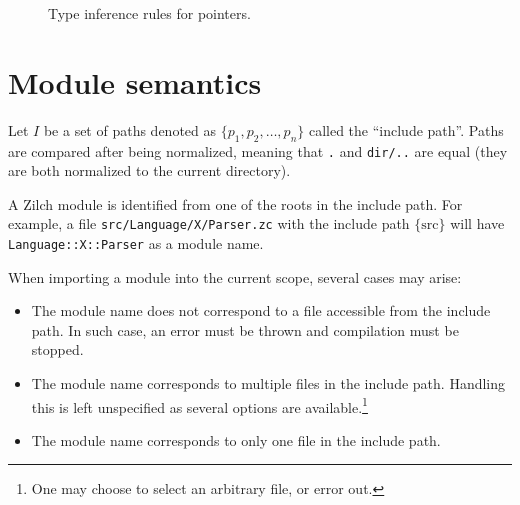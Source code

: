 \begin{figure}[H]

	\caption{Type inference rules for pointers.}
	\label{fig:zilch-staticsem-exprs-atoms-ptr-typerules}
\end{figure}

\section{Module semantics}\label{sec:zilch-staticsem-modules}

Let $I$ be a set of paths denoted as $\{ p_1, p_2, \ldots, p_n \}$ called the ``include path''.
Paths are compared after being normalized, meaning that \verb|.| and \verb|dir/..| are equal (they are both normalized to the current directory).

A Zilch module is identified from one of the roots in the include path.
For example, a file \verb|src/Language/X/Parser.zc| with the include path $\{ \text{src} \}$ will have \verb|Language::X::Parser| as a module name.

When importing a module into the current scope, several cases may arise:
\begin{itemize}
	\item The module name does not correspond to a file accessible from the include path.
	      In such case, an error must be thrown and compilation must be stopped.
	\item The module name corresponds to multiple files in the include path.
	      Handling this is left unspecified as several options are available.\footnote{One may choose to select an arbitrary file, or error out.}
	\item The module name corresponds to only one file in the include path.
\end{itemize}

